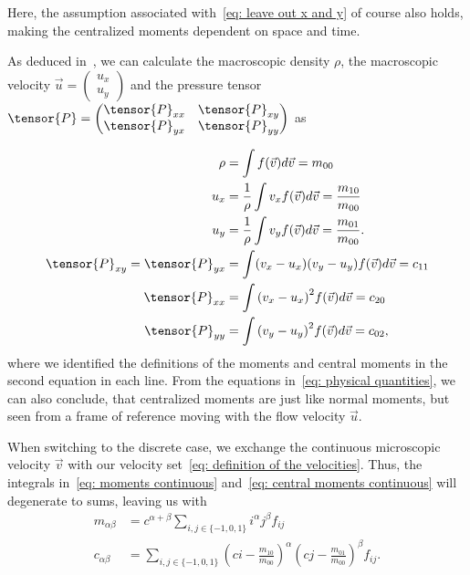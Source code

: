 Here, the assumption associated with~\eqref{eq: leave out x and y} of course also holds, making the centralized moments dependent on space and time.

As deduced in~\cite[pages 23 ff.]{harris2004introduction}, we can calculate the macroscopic density $\rho$, the macroscopic velocity $\vec{u}=\begin{pmatrix}u_x\\u_y\end{pmatrix}$ and the pressure tensor $\tensor{P}=\begin{pmatrix}\tensor{P}_{xx}&\tensor{P}_{xy}\\ \tensor{P}_{yx}&\tensor{P}_{yy}\end{pmatrix}$ as

\begin{equation}
  \label{eq: physical quantities}
  \begin{aligned}
    \rho & = \int f(\vec{v}) d\vec{v} = m_{00} \\
    u_x
    & = \frac{1}{\rho}\int v_x f(\vec{v}) d\vec{v} = \frac{ m_{10} }{ m_{00} }\\
    u_y
    & = \frac{1}{\rho}\int v_y f(\vec{v}) d\vec{v} = \frac{ m_{01} }{ m_{00} }.\\
    \tensor{P}_{xy}=\tensor{P}_{yx}
    & = \int (v_x - u_x)(v_y - u_y) f(\vec{v}) d\vec{v}
      = c_{11} \\
    \tensor{P}_{xx}
    & = \int {(v_x - u_x)}^2 f(\vec{v}) d\vec{v}
      = c_{20} \\
    \tensor{P}_{yy}
    & = \int {(v_y - u_y)}^2 f(\vec{v}) d\vec{v}
      = c_{02},
  \end{aligned}
\end{equation}
where we identified the definitions of the moments and central moments in the second equation in each line.
From the equations in~\eqref{eq: physical quantities}, we can also conclude, that centralized moments are just like normal moments, but seen from a frame of reference moving with the flow velocity $\vec{u}$.

When switching to the discrete case, we exchange the continuous microscopic velocity $\vec{v}$ with our velocity set~\eqref{eq: definition of the velocities}.
Thus, the integrals in~\eqref{eq: moments continuous} and~\eqref{eq: central moments continuous} will degenerate to sums, leaving us with
\begin{align}
  m_{\alpha\beta} &= c^{\alpha + \beta}\sum_{i,j \in \{-1,0,1\}} i^\alpha j^\beta f_{ij}
  \label{eq: moment definition}\\
  c_{\alpha\beta} &= \sum_{i,j \in \{-1,0,1\}}
  {\left(ci - \frac{m_{10}}{m_{00}}\right)}^\alpha
  {\left(cj - \frac{m_{01}}{m_{00}}\right)}^\beta f_{ij}.
  \label{eq: central moment definition}
\end{align}

